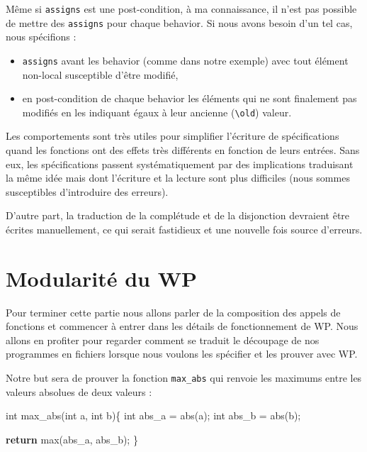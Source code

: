 \documentclass[12pt,francais,]{scrbook}
\newenvironment{Shaded}{}{}
\newcommand{\KeywordTok}[1]{\textcolor[rgb]{0.00,0.44,0.13}{\textbf{{#1}}}}
\newcommand{\DataTypeTok}[1]{\textcolor[rgb]{0.56,0.13,0.00}{{#1}}}
\newcommand{\NormalTok}[1]{{#1}}
\newenvironment{zdsalertblock}[1]{%
  \tcolorbox[beamer,%
    noparskip,breakable,
    colback=LightCoral,colframe=DarkRed,%
    colbacklower=Tomato,%
    title=#1]
}{\endtcolorbox}
\begin{document}
\begin{zdsalertblock}{Attention}
  Même si \texttt{assigns} est une
  post-condition, à ma connaissance, il n'est pas possible de
  mettre des \texttt{assigns} pour chaque behavior. Si nous avons
  besoin d'un tel cas, nous spécifions :
  \begin{itemize}
  \item \texttt{assigns} avant les behavior (comme dans notre exemple) avec
    tout élément non-local susceptible d'être modifié,
  \item en post-condition de chaque behavior les éléments qui ne sont
    finalement pas modifiés en les indiquant égaux à leur
    ancienne (\texttt{\textbackslash{}old}) valeur.
  \end{itemize}
\end{zdsalertblock}

Les comportements sont très utiles pour simplifier l'écriture de
spécifications quand les fonctions ont des effets très différents en
fonction de leurs entrées. Sans eux, les spécifications passent
systématiquement par des implications traduisant la même idée mais dont
l'écriture et la lecture sont plus difficiles (nous sommes susceptibles
d'introduire des erreurs).

D'autre part, la traduction de la complétude et de la disjonction
devraient être écrites manuellement, ce qui serait fastidieux et une
nouvelle fois source d'erreurs.

\section{Modularité du WP}\label{modularituxe9-du-wp}

Pour terminer cette partie nous allons parler de la composition des
appels de fonctions et commencer à entrer dans les détails de
fonctionnement de WP. Nous allons en profiter pour regarder comment se
traduit le découpage de nos programmes en fichiers lorsque nous voulons
les spécifier et les prouver avec WP.

Notre but sera de prouver la fonction \texttt{max\_abs} qui renvoie les
maximums entre les valeurs absolues de deux valeurs :

\begin{footnotesize}\begin{Shaded}
\begin{Highlighting}[]
\DataTypeTok{int} \NormalTok{max_abs(}\DataTypeTok{int} \NormalTok{a, }\DataTypeTok{int} \NormalTok{b)\{}
  \DataTypeTok{int} \NormalTok{abs_a = abs(a);}
  \DataTypeTok{int} \NormalTok{abs_b = abs(b);}

  \KeywordTok{return} \NormalTok{max(abs_a, abs_b);}
\NormalTok{\}}
\end{Highlighting}
\end{Shaded}\end{footnotesize}
\end{document}
